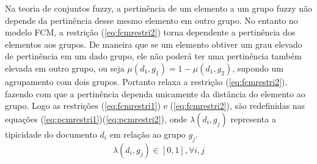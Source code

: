 Na teoria de conjuntos fuzzy, a pertinência de um elemento a um grupo fuzzy não depende da
pertinência desse mesmo elemento em outro grupo. No entanto no modelo FCM, a restrição
(\ref{eq:fcmrestri2}) torna dependente a pertinência dos elementos aos grupos. De maneira que
se um elemento obtiver um grau elevado de pertinência em um dado grupo, ele não poderá ter uma
pertinência também elevada em outro grupo, ou seja $\mu(d_1, g_1) = 1-\mu(d_1,g_2)$, supondo um
agrupamento com dois grupos. Portanto \cite{Krishnapuram1993} relaxa a restrição
(\ref{eq:fcmrestri2}), fazendo com que a pertinência dependa unicamente da distância do
elemento ao grupo. Logo as restrições (\ref{eq:fcmrestri1}) e (\ref{eq:fcmrestri2}), são 
redefinidas nas equações (\ref{eq:pcmrestri1})(\ref{eq:pcmrestri2}), onde $\lambda(d_i,g_j)$
representa a tipicidade do documento $d_i$ em relação ao grupo $g_j$.
\begin{equation}
  \lambda(d_i, g_j) \in [0,1], \forall i,j
  \label{eq:pcmrestri1}
\end{equation}

